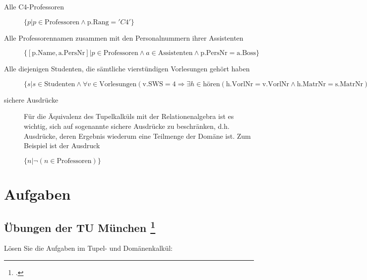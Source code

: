 \documentclass{lehramt-informatik}
\begin{document}
\begin{description}
\item[Alle C4-Professoren]
$\{p | p \in \text{Professoren} \land \text{p.Rang} = 'C4'\}$

\item[Alle Professorennamen zusammen mit den Personalnummern ihrer
Assistenten]

$\{[\text{p.Name}, \text{a.PersNr}] | p \in \text{Professoren} \land
a \in \text{Assistenten} \land \text{p.PersNr} = \text{a.Boss}\}$

\item[Alle diejenigen Studenten, die sämtliche vierstündigen Vorlesungen
gehört haben]

$\{s | s \in \text{Studenten} \land \forall
v \in \text{Vorlesungen}(\text{v.SWS} = 4 \Rightarrow
\exists h \in \text{hören}(\text{h.VorlNr} = \text{v.VorlNr} \land
\text{h.MatrNr} = \text{s.MatrNr}))\}$

\item[sichere Ausdrücke]

Für die Äquivalenz des Tupelkalküls mit der Relationenalgebra ist es
wichtig, sich auf sogenannte sichere Ausdrücke zu beschränken, d.h.
Ausdrücke, deren Ergebnis wiederum eine Teilmenge der Domäne ist. Zum
Beispiel ist der Ausdruck

$\{n | \neg (n \in \text{Professoren})\}$

\end{description}


\chapter{Aufgaben}

%

\section{Übungen der TU München
\footcite{net:pdf:tum:db-tutor-uebung}
}

Lösen Sie die Aufgaben im Tupel- und Domänenkalkül:
\end{document}
